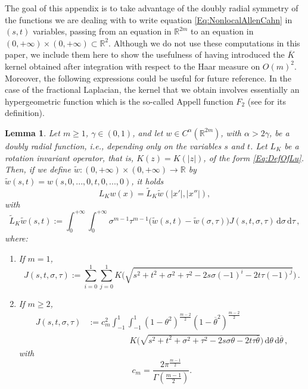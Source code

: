 \documentclass[12pt,reqno]{amsart}
\newtheorem{lemma}[theorem]{Lemma}
\theoremstyle{definition}
\theoremstyle{remark}
\newcommand{\con}[1]{\mathbb{#1}}
\newcommand{\R}{\con{R}} %
\newcommand{\s}{\gamma}
\renewcommand{\d}{\,\mathrm{d}} %
\numberwithin{equation}{section}
\begin{document}
The goal of this appendix is to take advantage of the doubly radial symmetry of the functions we are dealing with to write equation \eqref{Eq:NonlocalAllenCahn} in $(s,t)$ variables, passing from an equation in $\R^{2m}$ to an equation in $(0,+\infty)\times (0,+\infty)\subset \R^2$. Although we do not use these computations in this paper, we include them here to show the usefulness of having introduced the $\overline{K}$ kernel obtained after integration with respect to the Haar measure on $O(m)^2$. Moreover, the following expressions could be useful for future reference. In the case of the fractional Laplacian, the kernel that we obtain involves essentially an hypergeometric function which is the so-called Appell function $F_2$ (see \cite{Appell} for its definition).

\begin{lemma}
	\label{Lemma:OperatorInSTVariables} Let $m \geq 1$, $\s\in(0,1)$, and let $w\in
	C^\alpha(\R^{2m})$, with $\alpha > 2\s$, be a doubly radial function, i.e., depending only on the variables $s$ and $t$. Let $L_K$ be a rotation invariant operator, that is, $K(z) = K(|z|)$, of the form \eqref{Eq:DefOfLu}. Then, if we define $\tilde{w}:(0,+\infty)\times (0,+\infty) \to \R$ by $\tilde{w}(s,t) = w(s,0,...,0,t,0,...,0)$, it holds
	$$ L_Kw(x) = \tilde{L}_K \tilde{w} (|x'|,|x''|), $$
	with
	\begin{equation*}
	\label{Eq:OperatorInSTVariables}
	\widetilde{L}_K \tilde{w} (s,t) := \int_0^{+\infty}  \int_0^{+\infty} \sigma^{m-1} \tau^{m-1} \big(\tilde{w}(s,t) - \tilde{w}(\sigma, \tau)\big) J(s,t,\sigma, \tau)  \d \sigma\d \tau\,,
	\end{equation*}
	where:
	\begin{enumerate}
		\item If $m= 1$,
		\begin{equation}
		\label{Eq:KernelSTVariables1}
		J(s,t,\sigma, \tau) := \sum_{i=0}^1  \sum_{j =0}^1  K\Big(\sqrt{s^2 + t^2 + \sigma^2 + \tau^2 -2 s \sigma (-1)^i -2 t \tau (-1)^j}\Big)\,.
		\end{equation}
		
		\item If $m\geq 2$,
		\begin{align}
		J(s,t,\sigma, \tau) &:= c_m ^2  \int_{-1}^1  \int_{-1}^1  (1-\theta^2)^{\frac{m-2}{2}} (1-\overline{\theta}^2)^{\frac{m-2}{2}} \nonumber\\
		& \quad \quad \quad \quad \quad
		K\Big(\sqrt{s^2 + t^2 + \sigma^2 + \tau^2 -2 s \sigma \theta -2 t \tau \overline{\theta}}\Big) \d \theta \d \overline{\theta}\,, \label{Eq:KernelSTVariables2}
		\end{align}
		with
		$$
		c_m = \dfrac{2 \pi^{\frac{m-1}{2}}}{\Gamma (\frac{m-1}{2})}.
		$$
	\end{enumerate}
\end{lemma}
\end{document}
